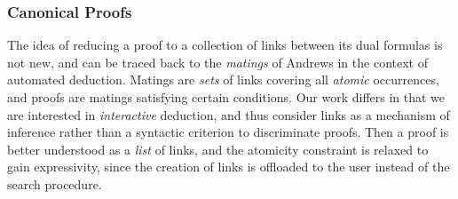 

\subsubsection*{Canonical Proofs}

The idea of reducing a proof to a collection of links between its dual formulas
is not new, and can be traced back to the \emph{matings} of Andrews
\cite{1674698} in the context of automated deduction. Matings are \emph{sets} of
links covering all \emph{atomic} occurrences, and proofs are matings satisfying
certain conditions. Our work differs in that we are interested in
\emph{interactive} deduction, and thus consider links as a mechanism of
inference rather than a syntactic criterion to discriminate proofs. Then a proof
is better understood as a \emph{list} of links, and the atomicity constraint is
relaxed to gain expressivity, since the creation of links is offloaded to the
user instead of the search procedure.

